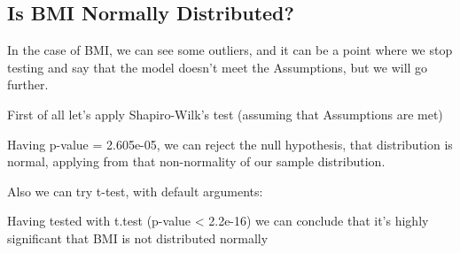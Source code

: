 \documentclass{article}
\begin{document}
\subsection{Is BMI Normally Distributed?}
In the case of BMI, we can see some outliers, and it can be a point where we stop testing and say that the model doesn't meet the Assumptions, but we will go further.
\newline

First of all let's apply Shapiro-Wilk’s test (assuming that Assumptions are met)

\begin{Schunk}
\end{Schunk}

Having p-value = 2.605e-05, we can reject the null hypothesis, that distribution is normal, applying from that non-normality of our sample distribution.


Also we can try t-test, with default arguments:
\newline
\begin{Schunk}
\end{Schunk}

Having tested with t.test (p-value < 2.2e-16) we can conclude that it's highly significant that BMI is not distributed normally
\end{document}
